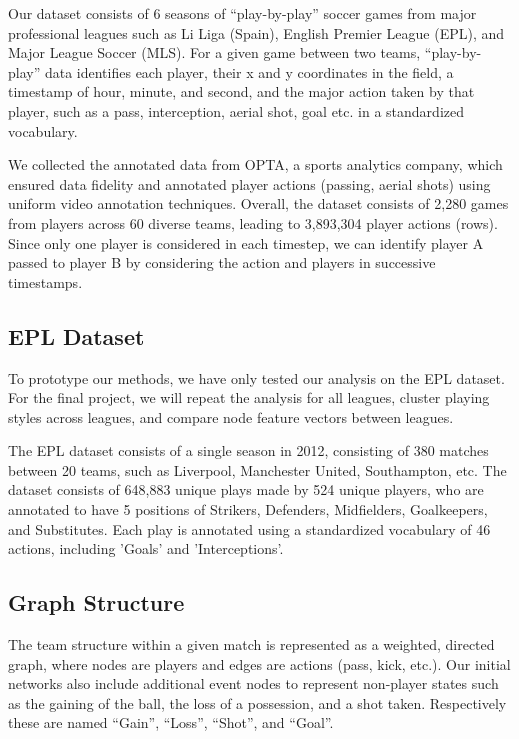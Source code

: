 Our dataset consists of 6 seasons of “play-by-play” soccer games from major professional leagues such as Li Liga (Spain), English Premier League (EPL), and Major League Soccer (MLS). For a given game between two teams, “play-by-play” data identifies each player, their x and y coordinates in the field, a timestamp of hour, minute, and second, and the major action taken by that player, such as a pass, interception, aerial shot, goal etc. in a standardized vocabulary. 

We collected the annotated data from OPTA, a sports analytics company, which ensured data fidelity and annotated player actions (passing, aerial shots) using uniform video annotation techniques. Overall, the dataset consists of 2,280 games from  players across 60 diverse teams, leading to  3,893,304 player actions (rows). Since only one player is considered in each timestep, we can identify player A passed to player B by considering the action and players in successive timestamps.  

\subsection{EPL Dataset}
To prototype our methods, we have only tested our analysis on the EPL dataset.
For the final project, we will repeat the analysis for all leagues, cluster playing styles across leagues, and compare node feature vectors between leagues.

The EPL dataset consists of a single season in 2012, consisting of 380 matches between 20 teams, such as Liverpool, Manchester United, Southampton, etc. The dataset consists of 648,883 unique plays made by 524 unique players, who are annotated to have 5 positions of Strikers, Defenders, Midfielders, Goalkeepers, and Substitutes. Each play is annotated using a standardized vocabulary of 46 actions, including 'Goals' and 'Interceptions'.


\subsection{Graph Structure}
The team structure within a given match is represented as a weighted, directed graph, where nodes are players and edges are actions (pass, kick, etc.). Our initial networks also include additional event nodes to represent non-player states such as the gaining of the ball, the loss of a possession, and a shot taken. Respectively these are named “Gain”, “Loss”, “Shot”, and “Goal”. 

